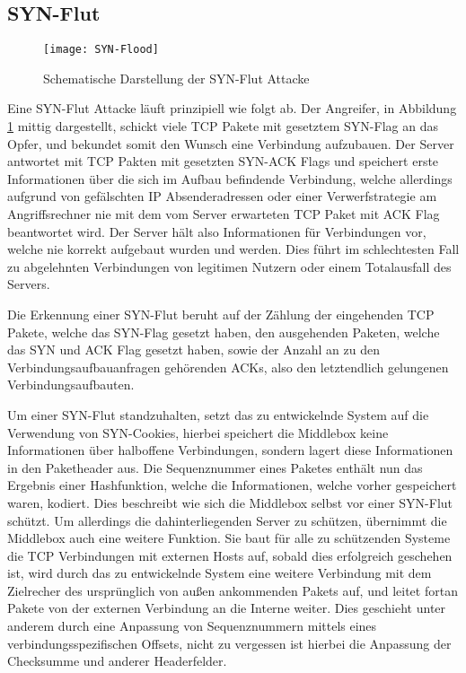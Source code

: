 \documentclass[../review_1.tex]{subfiles}
\begin{document}
\subsection{SYN-Flut}
\begin{figure}[t]
    \centering
    \texttt{[image: SYN-Flood]}
    \caption{Schematische Darstellung der SYN-Flut Attacke}
    \label{fig:SYN-Flood}
\end{figure}

Eine SYN-Flut Attacke läuft prinzipiell wie folgt ab. Der Angreifer, in Abbildung \ref{fig:SYN-Flood} mittig dargestellt, schickt viele TCP Pakete mit gesetztem SYN-Flag an das Opfer, und bekundet somit den Wunsch eine Verbindung aufzubauen. Der Server antwortet mit TCP Pakten mit gesetzten SYN-ACK Flags und speichert erste Informationen über die sich im Aufbau befindende Verbindung, welche allerdings aufgrund von gefälschten IP Absenderadressen oder einer Verwerfstrategie am Angriffsrechner nie mit dem vom Server erwarteten TCP Paket mit ACK Flag beantwortet wird. Der Server hält also Informationen für Verbindungen vor, welche nie korrekt aufgebaut wurden und werden. Dies führt im schlechtesten Fall zu abgelehnten Verbindungen von legitimen Nutzern oder einem Totalausfall des Servers.

Die Erkennung einer SYN-Flut beruht auf der Zählung der eingehenden TCP Pakete, welche das SYN-Flag gesetzt haben, den ausgehenden Paketen, welche das SYN und ACK Flag gesetzt haben, sowie der Anzahl an zu den Verbindungsaufbauanfragen gehörenden ACKs, also den letztendlich gelungenen Verbindungsaufbauten.

Um einer SYN-Flut standzuhalten, setzt das zu entwickelnde System auf die Verwendung von SYN-Cookies, hierbei speichert die Middlebox keine Informationen über halboffene Verbindungen, sondern lagert diese Informationen in den Paketheader aus. Die Sequenznummer eines Paketes enthält nun das Ergebnis einer Hashfunktion, welche die Informationen, welche vorher gespeichert waren, kodiert. Dies beschreibt wie sich die Middlebox selbst vor einer SYN-Flut schützt. Um allerdings die dahinterliegenden Server zu schützen, übernimmt die Middlebox auch eine weitere Funktion. Sie baut für alle zu schützenden Systeme die TCP Verbindungen mit externen Hosts auf, sobald dies erfolgreich geschehen ist, wird durch das zu entwickelnde System eine weitere Verbindung mit dem Zielrecher des ursprünglich von außen ankommenden Pakets auf, und leitet fortan Pakete von der externen Verbindung an die Interne weiter. Dies geschieht unter anderem durch eine Anpassung von Sequenznummern mittels eines verbindungsspezifischen Offsets, nicht zu vergessen ist hierbei die Anpassung der Checksumme und anderer Headerfelder.
\end{document}
